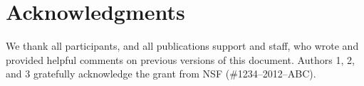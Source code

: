 \documentclass[../main/Feedback.tex]{subfiles}
\begin{document}
\section{Acknowledgments}

We thank all participants, and all publications support
and staff, who wrote and provided helpful comments on previous
versions of this document. Authors 1, 2, and 3 gratefully acknowledge
the grant from NSF (\#1234--2012--ABC). 
\end{document}
